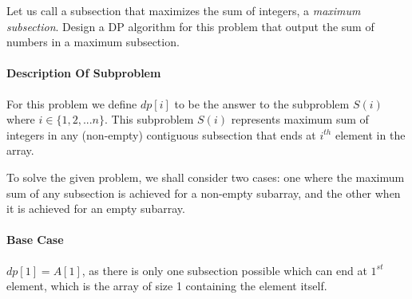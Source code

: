 \documentclass[answers]{exam}
\begin{document}
\begin{questions}

Let us call a subsection that maximizes the sum of integers, a {\it maximum subsection}. Design a DP algorithm for this problem that output the sum of numbers in a maximum subsection.





\begin{solution}
\paragraph{Description Of Subproblem}
For this problem we define $dp[i]$ to be the answer to the subproblem $S(i)$ where $i \in \{1,2,...n\}$. This subproblem $S(i)$ represents maximum sum of integers in any (non-empty) contiguous subsection that ends at $i^{th}$ element in the array.

To solve the given problem, we shall consider two cases: one where the maximum sum of any subsection is achieved for a non-empty subarray, and the other when it is achieved for an empty subarray.

\paragraph{Base Case}
$dp[1]=A[1]$, as there is only one subsection possible which can end at $1^{st}$ element, which is the array of size 1 containing the element itself.


\end{solution}
\end{questions}
\end{document}
